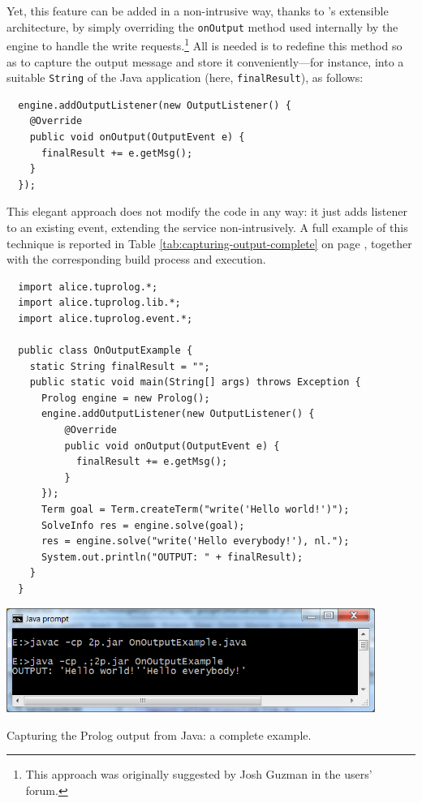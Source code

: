 Yet, this feature can be added in a non-intrusive way, thanks to \tuprolog{}'s extensible architecture, by simply overriding the \texttt{onOutput} method used internally by the engine to handle the write requests.\footnote{This approach was originally suggested by Josh Guzman in the \tuprolog{} users' forum.}
All is needed is to redefine this method so as to capture the output message and store it conveniently---for instance, into a suitable \texttt{String} of the Java application (here, \texttt{finalResult}), as follows:

\begin{verbatim}
  engine.addOutputListener(new OutputListener() {
    @Override
    public void onOutput(OutputEvent e) {
      finalResult += e.getMsg();
    }
  });
\end{verbatim}

\noindent This elegant approach does not modify the \tuprolog{} code in any way: it just adds listener to an existing event, extending the service non-intrusively.
%
A full example of this technique is reported in Table
\ref{tab:capturing-output-complete} on page \pageref{tab:capturing-output-complete}, together with the corresponding build process and execution.

\begin{table}[h]
{\small
\begin{verbatim}
  import alice.tuprolog.*;
  import alice.tuprolog.lib.*;
  import alice.tuprolog.event.*;

  public class OnOutputExample {
    static String finalResult = "";
    public static void main(String[] args) throws Exception {
      Prolog engine = new Prolog();
      engine.addOutputListener(new OutputListener() {
          @Override
          public void onOutput(OutputEvent e) {
            finalResult += e.getMsg();
          }
      });
      Term goal = Term.createTerm("write('Hello world!')");
      SolveInfo res = engine.solve(goal);
      res = engine.solve("write('Hello everybody!'), nl.");
      System.out.println("OUTPUT: " + finalResult);
    }
  }
\end{verbatim}}
  \includegraphics[width=12cm]{images/onOutput}
\caption{Capturing the Prolog output from Java: a complete example.}
\label{tab:capturing-output-complete}
\end{table}

